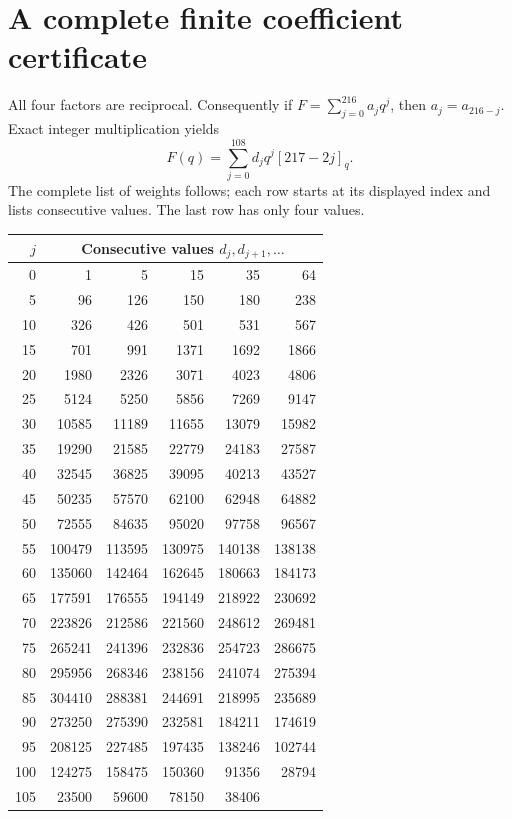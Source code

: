 \documentclass[11pt]{article}
\begin{document}
\section{A complete finite coefficient certificate}
All four factors are reciprocal. Consequently if
$F=\sum_{j=0}^{216}a_jq^j$, then $a_j=a_{216-j}$.
Exact integer multiplication yields
\begin{equation}\label{eq:centered}
 F(q)=\sum_{j=0}^{108}d_jq^j[217-2j]_q.
\end{equation}
The complete list of weights follows; each row starts at its displayed
index and lists consecutive values. The last row has only four values.
\begin{longtable}{r|rrrrr}
$j$ & \multicolumn{5}{c}{Consecutive values $d_j,d_{j+1},\ldots$}\\\hline
0 & 1 & 5 & 15 & 35 & 64\\
5 & 96 & 126 & 150 & 180 & 238\\
10 & 326 & 426 & 501 & 531 & 567\\
15 & 701 & 991 & 1371 & 1692 & 1866\\
20 & 1980 & 2326 & 3071 & 4023 & 4806\\
25 & 5124 & 5250 & 5856 & 7269 & 9147\\
30 & 10585 & 11189 & 11655 & 13079 & 15982\\
35 & 19290 & 21585 & 22779 & 24183 & 27587\\
40 & 32545 & 36825 & 39095 & 40213 & 43527\\
45 & 50235 & 57570 & 62100 & 62948 & 64882\\
50 & 72555 & 84635 & 95020 & 97758 & 96567\\
55 & 100479 & 113595 & 130975 & 140138 & 138138\\
60 & 135060 & 142464 & 162645 & 180663 & 184173\\
65 & 177591 & 176555 & 194149 & 218922 & 230692\\
70 & 223826 & 212586 & 221560 & 248612 & 269481\\
75 & 265241 & 241396 & 232836 & 254723 & 286675\\
80 & 295956 & 268346 & 238156 & 241074 & 275394\\
85 & 304410 & 288381 & 244691 & 218995 & 235689\\
90 & 273250 & 275390 & 232581 & 184211 & 174619\\
95 & 208125 & 227485 & 197435 & 138246 & 102744\\
100 & 124275 & 158475 & 150360 & 91356 & 28794\\
105 & 23500 & 59600 & 78150 & 38406 &\\
\end{longtable}
\end{document}
